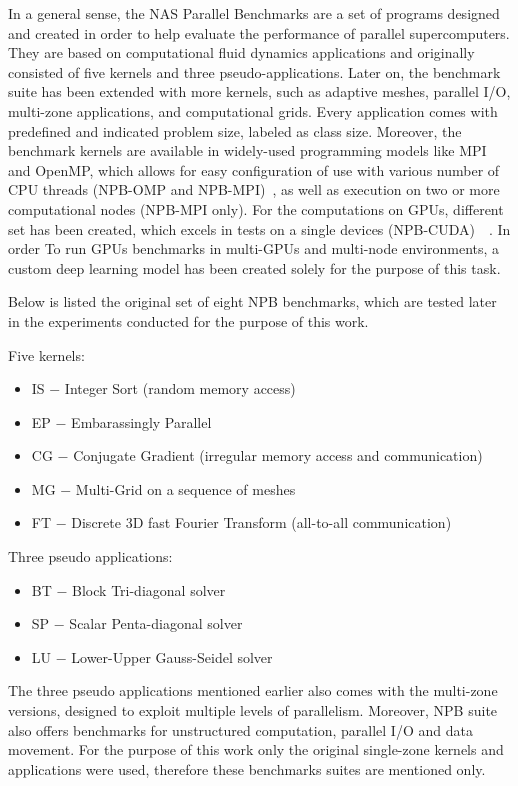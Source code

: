 In a general sense, the NAS Parallel Benchmarks are a set of programs designed
and created in order to help evaluate the performance of parallel
supercomputers. They are based on computational fluid dynamics applications and
originally consisted of five kernels and three pseudo-applications. Later on,
the benchmark suite has been extended with more kernels, such as adaptive meshes,
parallel I/O, multi-zone applications, and computational grids. Every application
comes with predefined and indicated problem size, labeled as class size.
Moreover, the benchmark kernels are available in widely-used programming
models like MPI and OpenMP, which allows for easy configuration of use with
various number of CPU threads (NPB-OMP and NPB-MPI)~\cite{NPB-CPP}, as well
as execution on two or more computational nodes (NPB-MPI only). For the
computations on GPUs, different set has been created, which excels in tests
on a single devices (NPB-CUDA)~\cite{NPB-CUDA_1}~\cite{NPB-CUDA_2}. In order To
run GPUs benchmarks in multi-GPUs and multi-node environments, a custom deep
learning model has been created solely for the purpose of this task.

Below is listed the original set of eight NPB benchmarks, which are tested later in the
experiments conducted for the purpose of this work.

Five kernels:
\begin{itemize}
    \item IS $-$ Integer Sort (random memory access)
    \item EP $-$ Embarassingly Parallel
    \item CG $-$ Conjugate Gradient (irregular memory access and communication)
    \item MG $-$ Multi-Grid on a sequence of meshes
    \item FT $-$ Discrete 3D fast Fourier Transform (all-to-all communication)
\end{itemize}

Three pseudo applications:
\begin{itemize}
    \item BT $-$ Block Tri-diagonal solver
    \item SP $-$ Scalar Penta-diagonal solver
    \item LU $-$ Lower-Upper Gauss-Seidel solver
\end{itemize}

The three pseudo applications mentioned earlier also comes with the multi-zone
versions, designed to exploit multiple levels of parallelism. Moreover, NPB
suite also offers benchmarks for unstructured computation, parallel I/O and
data movement. For the purpose of this work only the original single-zone
kernels and applications were used, therefore these benchmarks suites are
mentioned only.

